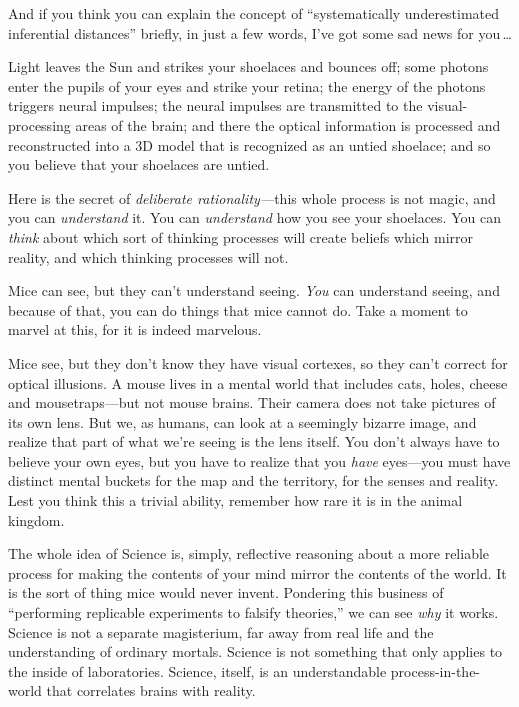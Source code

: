 {
 And if you think you can explain the concept of
``systematically underestimated inferential
distances'' briefly, in just a few words,
I've got some sad news for you\,\ldots}

\myendsectiontext


{
 Light leaves the Sun and strikes your shoelaces and bounces off;
some photons enter the pupils of your eyes and strike your retina; the
energy of the photons triggers neural impulses; the neural impulses are
transmitted to the visual-processing areas of the brain; and there the
optical information is processed and reconstructed into a 3D model that
is recognized as an untied shoelace; and so you believe that your
shoelaces are untied. }

{
 Here is the secret of \textit{deliberate rationality---}this whole
process is not magic, and you can \textit{understand} it. You can
\textit{understand} how you see your shoelaces. You can \textit{think}
about which sort of thinking processes will create beliefs which mirror
reality, and which thinking processes will not.}

{
 Mice can see, but they can't understand seeing.
\textit{You} can understand seeing, and because of that, you can do
things that mice cannot do. Take a moment to marvel at this, for it is
indeed marvelous.}

{
 Mice see, but they don't know they have visual
cortexes, so they can't correct for optical illusions.
A mouse lives in a mental world that includes cats, holes, cheese and
mousetraps---but not mouse brains. Their camera does not take pictures
of its own lens. But we, as humans, can look at a seemingly bizarre
image, and realize that part of what we're seeing is
the lens itself. You don't always have to believe your
own eyes, but you have to realize that you \textit{have} eyes---you
must have distinct mental buckets for the map and the territory, for
the senses and reality. Lest you think this a trivial ability, remember
how rare it is in the animal kingdom.}

{
 The whole idea of Science is, simply, reflective reasoning about a
more reliable process for making the contents of your mind mirror the
contents of the world. It is the sort of thing mice would never invent.
Pondering this business of ``performing replicable
experiments to falsify theories,'' we can see
\textit{why} it works. Science is not a separate magisterium, far away
from real life and the understanding of ordinary mortals. Science is
not something that only applies to the inside of laboratories. Science,
itself, is an understandable process-in-the-world that correlates
brains with reality.}

